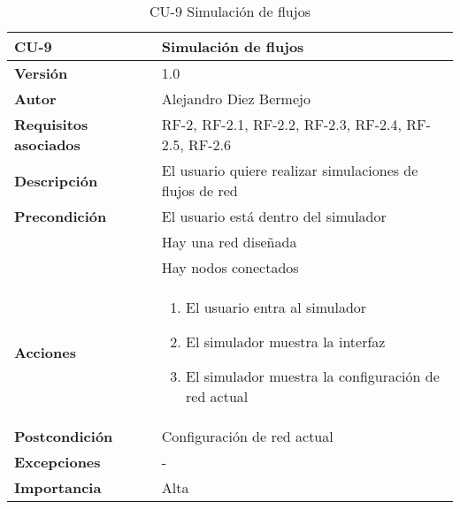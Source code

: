 \begin{table}[p]
	\centering
	\begin{tabularx}{\linewidth}{ p{} p{} }
		\toprule
		\textbf{CU-9}    & \textbf{Simulación de flujos}\\
		\toprule
		\textbf{Versión}              & 1.0    \\
		\textbf{Autor}                & Alejandro Diez Bermejo \\
		\textbf{Requisitos asociados} & RF-2, RF-2.1, RF-2.2, RF-2.3, RF-2.4, RF-2.5, RF-2.6 \\
		\textbf{Descripción}          & El usuario quiere realizar simulaciones de flujos de red \\
        \textbf{Precondición}         & El usuario está dentro del simulador \\
                                      & Hay una red diseñada \\
                                      & Hay nodos conectados \\
		\textbf{Acciones}             &
		\begin{enumerate}
			\def\labelenumi{\arabic{enumi}.}
			\tightlist
			\item El usuario entra al simulador
            \item El simulador muestra la interfaz
            \item El simulador muestra la configuración de red actual
		\end{enumerate}\\
		\textbf{Postcondición}        & Configuración de red actual \\
		\textbf{Excepciones}          & - \\
		\textbf{Importancia}          & Alta \\
		\bottomrule
	\end{tabularx}
	\caption{CU-9 Simulación de flujos}
\end{table}

